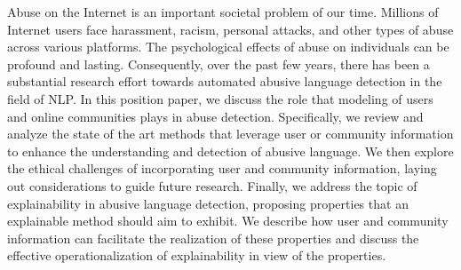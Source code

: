 Abuse on the Internet is an important societal problem of our time. Millions of Internet users face harassment, racism, personal attacks, and other types of abuse across various platforms. The psychological effects of abuse on individuals can be profound and lasting. Consequently, over the past few years, there has been a substantial research effort towards automated abusive language detection in the field of NLP. In this position paper, we discuss the role that modeling of users and online communities plays in abuse detection. Specifically, we review and analyze the state of the art methods that leverage user or community information to enhance the understanding and detection of abusive language. We then explore the ethical challenges of incorporating user and community information, laying out considerations to guide future research. Finally, we address the topic of explainability in abusive language detection, proposing properties that an explainable method should aim to exhibit. We describe how user and community information can facilitate the realization of these properties and discuss the effective operationalization of explainability in view of the properties.
